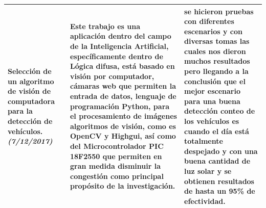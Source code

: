 \begin{center}
\begin{longtable}{|p{3.0cm}|p{7.4cm}|p{5.0cm}|}
		Selección de un algoritmo de visión de computadora para la detección de vehículos. \cite{ittap} \newline \emph{(7/12/2017)}&
		Este trabajo es una aplicación dentro del campo de la Inteligencia Artificial, específicamente dentro de Lógica difusa, está basado en visión por computador, cámaras web que permiten la entrada de datos, lenguaje de programación Python, para el procesamiento de imágenes algoritmos de visión, como es OpenCV y Highgui, así como del Microcontrolador PIC 18F2550 que permiten en gran medida disminuir la congestión como principal propósito de la investigación.&
		se hicieron pruebas con diferentes escenarios y con diversas tomas las cuales nos dieron muchos resultados pero llegando a la conclusión que el mejor escenario para una buena detección conteo de los vehículos es cuando el día está totalmente despejado y con una buena cantidad de luz solar y se obtienen resultados de hasta un 95\% de efectividad. \\ \hline
		
		
	\end{longtable}
	
\end{center}


